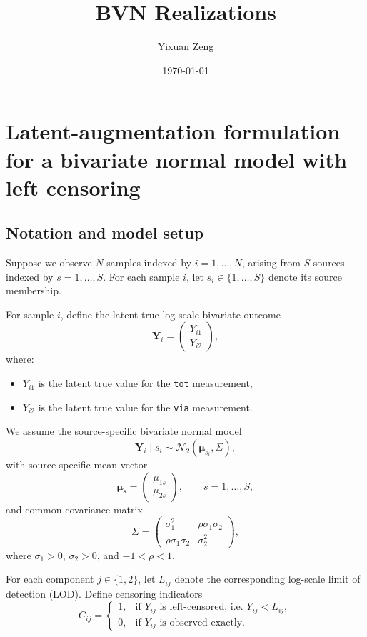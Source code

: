 \documentclass[12pt]{article}
\title{BVN Realizations}
\author{Yixuan Zeng}
\date{\today}
\begin{document}
\maketitle



\section{Latent-augmentation formulation for a bivariate normal model with left censoring}

\subsection{Notation and model setup}

Suppose we observe \(N\) samples indexed by \(i=1,\dots,N\), arising from \(S\) sources indexed by \(s=1,\dots,S\).
For each sample \(i\), let \(s_i \in \{1,\dots,S\}\) denote its source membership.

For sample \(i\), define the latent true log-scale bivariate outcome
\[
\mathbf{Y}_i
=
\begin{pmatrix}
Y_{i1}\\
Y_{i2}
\end{pmatrix},
\]
where:
\begin{itemize}
    \item \(Y_{i1}\) is the latent true value for the \texttt{tot} measurement,
    \item \(Y_{i2}\) is the latent true value for the \texttt{via} measurement.
\end{itemize}

We assume the source-specific bivariate normal model
\[
\mathbf{Y}_i \mid s_i
\sim
\mathcal{N}_2(\boldsymbol{\mu}_{s_i}, \Sigma),
\]
with source-specific mean vector
\[
\boldsymbol{\mu}_{s}
=
\begin{pmatrix}
\mu_{1s}\\
\mu_{2s}
\end{pmatrix},
\qquad s=1,\dots,S,
\]
and common covariance matrix
\[
\Sigma
=
\begin{pmatrix}
\sigma_1^2 & \rho \sigma_1 \sigma_2\\
\rho \sigma_1 \sigma_2 & \sigma_2^2
\end{pmatrix},
\]
where \(\sigma_1>0\), \(\sigma_2>0\), and \(-1<\rho<1\).

For each component \(j\in\{1,2\}\), let \(L_{ij}\) denote the corresponding log-scale limit of detection (LOD).  
Define censoring indicators
\[
C_{ij}
=
\begin{cases}
1, & \text{if } Y_{ij} \text{ is left-censored, i.e. } Y_{ij}<L_{ij},\\
0, & \text{if } Y_{ij} \text{ is observed exactly.}
\end{cases}
\]
\end{document}
